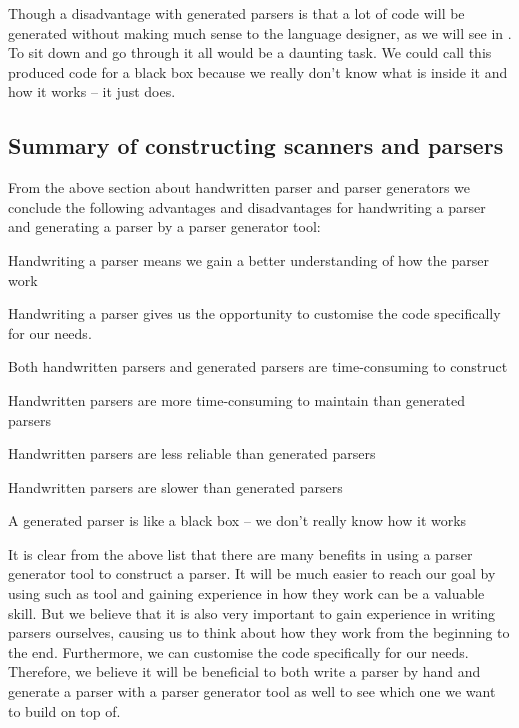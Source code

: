 Though a disadvantage with generated parsers is that a lot of code will
be generated without making much sense to the language designer, as
we will see in . To sit down and go
through it all would be a daunting task. We could call this produced
code for a black box because we really don't know what is inside it and
how it works -- it just does.

\subsection{Summary of constructing scanners and parsers}
\label{subsec:summary-parser}
From the above section about handwritten parser and parser generators we
conclude the following advantages and disadvantages for handwriting a parser and
generating a parser by a parser generator tool:

\begin{dlist}
  \item Handwriting a parser means we gain a better understanding of how the
    parser work
  \item Handwriting a parser gives us the opportunity to customise the code
    specifically for our needs.
  \item Both handwritten parsers and generated parsers are time-consuming to
    construct
  \item Handwritten parsers are more time-consuming to maintain than generated
    parsers
  \item Handwritten parsers are less reliable than generated parsers
  \item Handwritten parsers are slower than generated parsers
  \item A generated parser is like a black box -- we don't really know how it
    works
\end{dlist}

It is clear from the above list that there are many benefits in using
a parser generator tool to construct a parser. It will be much easier
to reach our goal by using such as tool and gaining experience in how
they work can be a valuable skill. But we believe that it is also very
important to gain experience in writing parsers ourselves, causing us to
think about how they work from the beginning to the end. Furthermore, we
can customise the code specifically for our needs. Therefore, we believe
it will be beneficial to both write a parser by hand and generate a
parser with a parser generator tool as well to see which one we want to
build on top of.
